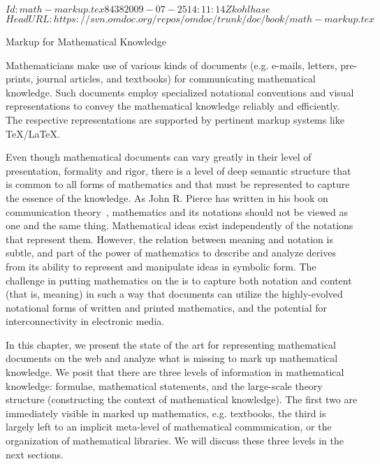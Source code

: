 \svnInfo $Id: math-markup.tex 8438 2009-07-25 14:11:14Z kohlhase $
\svnKeyword $HeadURL: https://svn.omdoc.org/repos/omdoc/trunk/doc/book/math-markup.tex $

\begin{omgroup}[id=math-markup]{Markup for Mathematical Knowledge}

  Mathematicians make use of various kinds of documents (e.g. e-mails, letters,
  pre-prints, journal articles, and textbooks) for communicating mathematical
  knowledge. Such documents employ specialized notational conventions and visual
  representations to convey the mathematical knowledge reliably and efficiently.  The
  respective representations are supported by pertinent markup systems like {\TeX/\LaTeX}.

  Even though mathematical documents can vary greatly in their level of presentation,
  formality and rigor, there is a level of deep semantic structure that is common to all
  forms of mathematics and that must be represented to capture the essence of the
  knowledge. As John R. Pierce has written in his book on communication
  theory~\cite{Pierce:aitit80}, mathematics and its notations should not be viewed as one
  and the same thing. Mathematical ideas exist independently of the notations that
  represent them. However, the relation between meaning and notation is subtle, and part
  of the power of mathematics to describe and analyze derives from its ability to
  represent and manipulate ideas in symbolic form. The challenge in putting mathematics on
  the {} is to capture both notation and content (that is,
  meaning) in such a way that documents can utilize the highly-evolved notational forms of
  written and printed mathematics, and the potential for interconnectivity in electronic
  media.

  In this chapter, we present the state of the art for representing mathematical documents
  on the web and analyze what is missing to mark up mathematical knowledge.  We posit that
  there are three levels of information in mathematical knowledge: formulae, mathematical
  statements, and the large-scale theory structure (constructing the context of
  mathematical knowledge). The first two are immediately visible in marked up mathematics,
  e.g.  textbooks, the third is largely left to an implicit meta-level of mathematical
  communication, or the organization of mathematical libraries. We will discuss these
  three levels in the next sections.


\end{omgroup}
